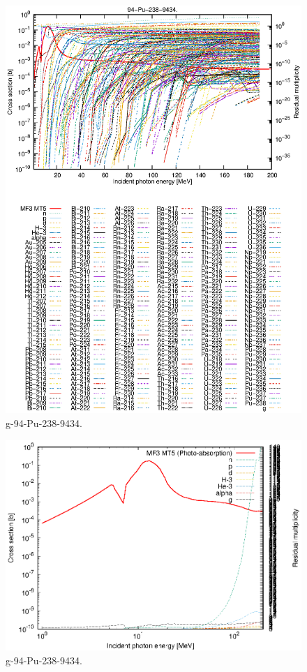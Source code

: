 \begin{figure}
 \includegraphics[width=\linewidth]{eps/g_94-Pu-238_9434.eps}
  \caption{g-94-Pu-238-9434.}
\end{figure}
\newpage \clearpage

\begin{figure}
 \includegraphics[width=\linewidth]{eps-log/g_94-Pu-238_9434.eps}
 \caption{g-94-Pu-238-9434.}
\end{figure}
\newpage \clearpage

